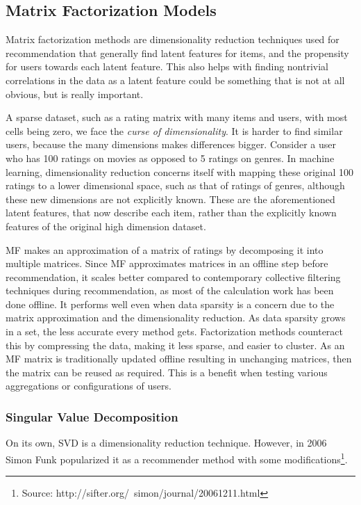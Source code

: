 \subsection{Matrix Factorization Models} \label{bg:sub:factorizationmodels}
Matrix factorization methods are dimensionality reduction techniques used for recommendation that generally find latent features for items, and the propensity for users towards each latent feature. This also helps with finding nontrivial correlations in the data as a latent feature could be something that is not at all obvious, but is really important.

A sparse dataset, such as a rating matrix with many items and users, with most cells being zero, we face the \textit{curse of dimensionality}. It is harder to find similar users, because the many dimensions makes differences bigger. Consider a user who has 100 ratings on movies as opposed to 5 ratings on genres. In machine learning, dimensionality reduction concerns itself with mapping these original 100 ratings to a lower dimensional space, such as that of ratings of genres, although these new dimensions are not explicitly known. These are the aforementioned latent features, that now describe each item, rather than the explicitly known features of the original high dimension dataset\cite{recsys_dimensionalityreduction}.

MF makes an approximation of a matrix of ratings by decomposing it into multiple matrices. Since MF approximates matrices in an offline step before recommendation, it scales better compared to contemporary collective filtering techniques during recommendation, as most of the calculation work has been done offline. It performs well even when data sparsity is a concern due to the matrix approximation and the dimensionality reduction.
As data sparsity grows in a set, the less accurate every method gets. Factorization methods counteract this by compressing the data, making it less sparse, and easier to cluster.
As an MF matrix is traditionally updated offline resulting in unchanging matrices, then the matrix can be reused as required. This is a benefit when testing various aggregations or configurations of users.

\subsubsection{Singular Value Decomposition}
On its own, SVD is a dimensionality reduction technique. However, in 2006 Simon Funk popularized it as a recommender method with some modifications\footnote{Source: http://sifter.org/~simon/journal/20061211.html}.

